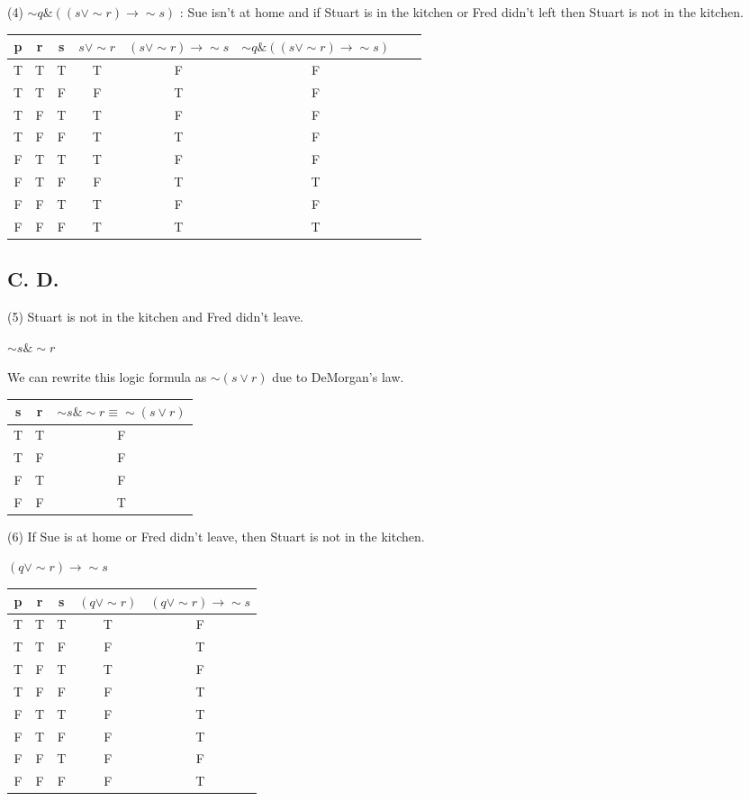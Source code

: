 \documentclass{article}
\begin{document}
(4) $\sim q \& ((s \lor \sim r) \rightarrow \sim s)$ : Sue isn't at home and if Stuart is in the kitchen or Fred didn't left then Stuart is not in the kitchen. 

\begin{tabular}{ccc|ccccc}
p &r & s & $s \lor \sim r$ & $(s \lor \sim r) \rightarrow \sim s$ & $\sim q \& ((s \lor \sim r) \rightarrow \sim s)$ \\
\hline 
T &T & T & T & F & F \\
T &T & F & F & T & F\\
T &F & T & T & F & F\\
T &F & F & T & T & F\\
F &T & T & T & F & F\\
F &T & F & F & T & T\\
F &F & T & T & F & F\\
F &F & F & T & T & T\\
\end{tabular}

\subsection*{C. D.}
(5) Stuart is not in the kitchen and Fred didn’t leave. 

$\sim s \& \sim r$

We can rewrite this logic formula as $\sim (s \lor r)$ due to DeMorgan's law.

\begin{tabular}{cc|c}
s & r & $\sim s \& \sim r \equiv \sim (s \lor r)$ \\
\hline 
T & T & F  \\
T & F & F \\
F & T & F  \\
F & F & T  \\
\end{tabular}

(6) If Sue is at home or Fred didn’t leave, then Stuart is not in the kitchen.

$(q \lor \sim r) \rightarrow \sim s$

\begin{tabular}{ccc|cc}
p & r & s & $(q \lor \sim r)$ & $(q \lor \sim r) \rightarrow \sim s$ \\
\hline 
T & T & T & T & F  \\
T & T & F & F & T \\
T & F & T & T & F \\
T & F & F & F & T \\
F & T & T & F & T \\
F & T & F & F & T \\
F & F & T & F & F \\
F & F & F & F & T \\
\end{tabular}
\end{document}
